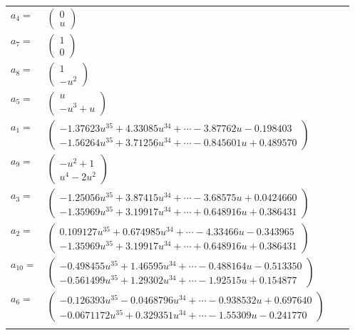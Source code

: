\documentclass[1p]{elsarticle_modified}
\theoremstyle{definition}
\begin{document}
\begin{tabular}{m{7pt} m{180pt} m{7pt} m{180pt} }
\flushright $a_{4}=$&$\begin{pmatrix}0\\u\end{pmatrix}$ \\
\flushright $a_{7}=$&$\begin{pmatrix}1\\0\end{pmatrix}$ \\
\flushright $a_{8}=$&$\begin{pmatrix}1\\- u^2\end{pmatrix}$ \\
\flushright $a_{5}=$&$\begin{pmatrix}u\\- u^3+u\end{pmatrix}$ \\
\flushright $a_{1}=$&$\begin{pmatrix}-1.37623 u^{35}+4.33085 u^{34}+\cdots-3.87762 u-0.198403\\-1.56264 u^{35}+3.71256 u^{34}+\cdots-0.845601 u+0.489570\end{pmatrix}$ \\
\flushright $a_{9}=$&$\begin{pmatrix}- u^2+1\\u^4-2 u^2\end{pmatrix}$ \\
\flushright $a_{3}=$&$\begin{pmatrix}-1.25056 u^{35}+3.87415 u^{34}+\cdots-3.68575 u+0.0424660\\-1.35969 u^{35}+3.19917 u^{34}+\cdots+0.648916 u+0.386431\end{pmatrix}$ \\
\flushright $a_{2}=$&$\begin{pmatrix}0.109127 u^{35}+0.674985 u^{34}+\cdots-4.33466 u-0.343965\\-1.35969 u^{35}+3.19917 u^{34}+\cdots+0.648916 u+0.386431\end{pmatrix}$ \\
\flushright $a_{10}=$&$\begin{pmatrix}-0.498455 u^{35}+1.46595 u^{34}+\cdots-0.488164 u-0.513350\\-0.561499 u^{35}+1.29302 u^{34}+\cdots-1.92515 u+0.154877\end{pmatrix}$ \\
\flushright $a_{6}=$&$\begin{pmatrix}-0.126393 u^{35}-0.0468796 u^{34}+\cdots-0.938532 u+0.697640\\-0.0671172 u^{35}+0.329351 u^{34}+\cdots-1.55309 u-0.241770\end{pmatrix}$\\&\end{tabular}
\end{document}
